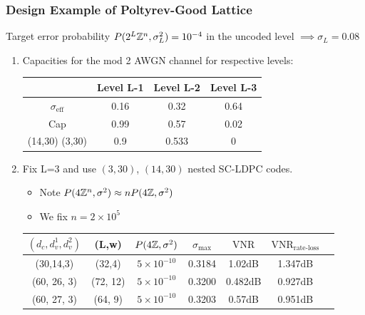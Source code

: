 \documentclass[10pt]{beamer}
\begin{document}
\begin{frame}\frametitle{Design Example of Poltyrev-Good Lattice}
Target error probability $P(2^L\mathbb{Z}^n,\sigma_{L}^2)=10^{-4}$ in the uncoded level $\implies\sigma_{L}=0.08$
\begin{enumerate}
\item  Capacities for the mod 2 AWGN  channel for respective levels: 
\vspace{0.1in}
\begin{center}
\begin{tabular}{| c | c | c | c | }
\hline
 & Level L-1   &  Level L-2  & Level L-3 \\
\hline 
$\sigma_{\text{eff}}$ & 0.16   &  0.32  & 0.64 \\ \hline
 Cap                           &  0.99 & 0.57 & 0.02 \\   \hline
 (14,30) (3,30)         &  0.9 & 0.533 & 0 \\   \hline
\end{tabular}
\end{center}
\vspace{0.1in}
\item Fix L=3 and use $(3,30)$, $(14,30)$ nested SC-LDPC codes.
\begin{itemize}
\item Note $P(4\mathbb{Z}^n,\sigma^2)\approx nP(4\mathbb{Z},\sigma^2)$
\item We fix $n=2\times 10^5$
\end{itemize}
\vspace{0.07in}
\begin{center}
\begin{tabular}{c c c c c c c}
\hline  \hline
$(d_{c},d_{v}^{1},d_{v}^{2})$ &(L,w)& $P(4\mathbb{Z},\sigma^{2})$ & $\sigma_{\text{max}}$ &$\text{VNR}$ &$\text{VNR}_{\text{rate-loss}}$\\
\hline
(30,14,3) & (32,4) & $5 \times 10^{-10}$ & 0.3184 & 1.02dB & 1.347dB \\
(60, 26, 3)& (72, 12)& $5 \times 10^{-10}$ & 0.3200 &0.482dB & 0.927dB\\
(60, 27, 3)& (64, 9)& $5 \times 10^{-10}$  &  0.3203 & 0.57dB & 0.951dB\\
\end{tabular}
\end{center}
\end{enumerate}
\end{frame}
\end{document}
